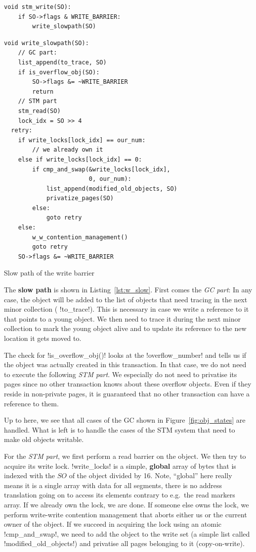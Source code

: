 \documentclass{sigplanconf}
\makeatletter
\renewcommand\lstinline[1][]{%
  \Collectverb{\@@myverb}%
}
\def\@@myverb#1{%
    \begingroup
    \fboxsep=0.2em
    \colorbox{verylightgray}{\oldlstinline|#1|}%
    \endgroup
}
\makeatother
\begin{document}
\begin{lstlisting}
void stm_write(SO):
	if SO->flags & WRITE_BARRIER:
		write_slowpath(SO)
\end{lstlisting}

\begin{code}[h]
\begin{lstlisting}
void write_slowpath(SO):
	// GC part:
	list_append(to_trace, SO)
	if is_overflow_obj(SO):
		SO->flags &= ~WRITE_BARRIER
		return
	// STM part
	stm_read(SO)
	lock_idx = SO >> 4
  retry:
	if write_locks[lock_idx] == our_num:
		// we already own it
	else if write_locks[lock_idx] == 0:
		if cmp_and_swap(&write_locks[lock_idx],
					    0, our_num):
			list_append(modified_old_objects, SO)
			privatize_pages(SO)
		else:
			goto retry
	else:
		w_w_contention_management()
		goto retry
	SO->flags &= ~WRITE_BARRIER
\end{lstlisting}

\caption{Slow path of the write barrier\label{lst:w_slow}}
\end{code}


The \textbf{slow path} is shown in Listing~\ref{lst:w_slow}.
First comes the \emph{GC part}: In any case, the object will be added
to the list of objects that need tracing in the next minor collection
(\lstinline!to_trace!).  This is necessary in case we write a
reference to it that points to a young object. We then need to trace
it during the next minor collection to mark the young object
alive and to update its reference to the new location it gets moved
to.

The check for \lstinline!is_overflow_obj()! looks at the
\lstinline!overflow_number!  and tells us if the object was actually
created in this transaction. In that case, we do not need to execute
the following \emph{STM part}.  We especially do not need to privatise
its pages since no other transaction knows about these overflow
objects. Even if they reside in non-private pages, it is guaranteed
that no other transaction can have a reference to them.

Up to here, we see that all cases of the GC shown in
Figure~\ref{fig:obj_states} are handled. What is left is to handle the
cases of the STM system that need to make old objects writable.

For the \emph{STM part}, we first perform a read barrier on the
object. We then try to acquire its write lock. \lstinline!write_locks!
is a simple, \textbf{global} array of bytes that is indexed with the
$SO$ of the object divided by 16. Note, ``global'' here really means
it is a single array with data for all segments, there is no address
translation going on to access its elements contrary to e.g.\ the
read markers array.  If we already own the lock, we are done.
If someone else owns the lock, we perform  write-write contention
management that aborts either us or the current owner of the
object.  If we succeed in acquiring the lock using an atomic
\lstinline!cmp_and_swap!, we need to add the object to the write set
(a simple list called \lstinline!modified_old_objects!)  and privatise
all pages belonging to it (copy-on-write).
\end{document}
